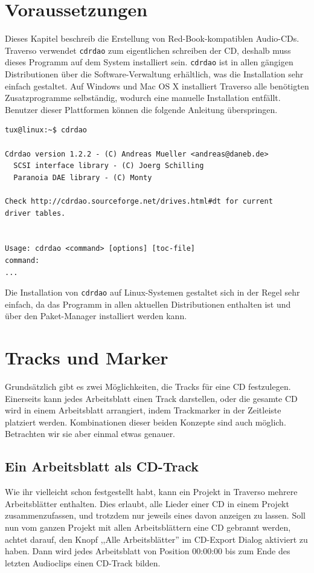 \section{Voraussetzungen}
Dieses Kapitel beschreib die Erstellung von Red-Book-kompatiblen Audio-CDs. Traverso verwendet \texttt{cdrdao} zum eigentlichen schreiben der CD, deshalb muss dieses Programm auf dem System installiert sein. \texttt{cdrdao} ist in allen gängigen Distributionen über die Software-Verwaltung erhältlich, was die Installation sehr einfach gestaltet. Auf Windows und Mac OS X installiert Traverso alle benötigten Zusatzprogramme selbständig, wodurch eine manuelle Installation entfällt. Benutzer dieser Plattformen können die folgende Anleitung überspringen.

\footnotesize
\begin{verbatim}
tux@linux:~$ cdrdao

Cdrdao version 1.2.2 - (C) Andreas Mueller <andreas@daneb.de>
  SCSI interface library - (C) Joerg Schilling
  Paranoia DAE library - (C) Monty

Check http://cdrdao.sourceforge.net/drives.html#dt for current 
driver tables.


Usage: cdrdao <command> [options] [toc-file]
command:
...
\end{verbatim}
\normalsize

Die Installation von \texttt{cdrdao} auf Linux-Systemen gestaltet sich in der Regel sehr einfach, da das Programm in allen aktuellen Distributionen enthalten ist und über den Paket-Manager installiert werden kann.

\section{Tracks und Marker}
Grundsätzlich gibt es zwei Möglichkeiten, die Tracks für eine CD festzulegen. Einerseits kann jedes Arbeitsblatt einen Track darstellen, oder die gesamte CD wird in einem Arbeitsblatt arrangiert, indem Trackmarker in der Zeitleiste platziert werden. Kombinationen dieser beiden Konzepte sind auch möglich. Betrachten wir sie aber einmal etwas genauer.

\subsection{Ein Arbeitsblatt als CD-Track}
Wie ihr vielleicht schon festgestellt habt, kann ein Projekt in Traverso mehrere Arbeitsblätter enthalten. Dies erlaubt, alle Lieder einer CD in einem Projekt zusammenzufassen, und trotzdem nur jeweils eines davon anzeigen zu lassen. Soll nun vom ganzen Projekt mit allen Arbeitsblättern eine CD gebrannt werden, achtet darauf, den Knopf ,,Alle Arbeitsblätter'' im CD-Export Dialog aktiviert zu haben. Dann wird jedes Arbeitsblatt von Position 00:00:00 bis zum Ende des letzten Audioclips einen CD-Track bilden.

